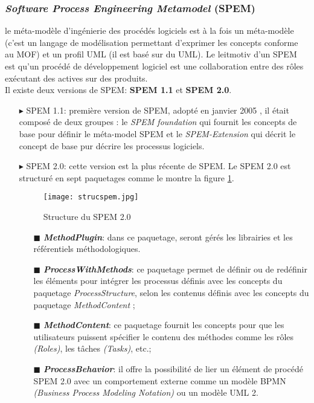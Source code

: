 \begin{itemize}
\subsubsection*{\textit{Software Process Engineering Metamodel} (SPEM)}
le méta-modèle d'ingénierie des procédés logiciels est à la fois un méta-modèle (c'est un langage de modélisation permettant d'exprimer les concepts conforme au MOF) et un profil UML (il est basé sur du UML). Le leitmotiv d'un SPEM est qu'un procédé de développement logiciel est une collaboration entre des rôles exécutant des actives sur des produits. \\
Il existe deux versions de SPEM: \textbf{SPEM 1.1} et \textbf{SPEM 2.0}.
\begin{itemize}
\item[\tiny{$\blacktriangleright$}] SPEM 1.1: première version de SPEM, adopté en janvier 2005 \cite{omg1}, il était composé de deux groupes : le \textit{SPEM foundation} qui fournit les concepts de base pour définir le méta-model SPEM et le \textit{SPEM-Extension} qui décrit le concept de base pur décrire les processus logiciels. 
\item[\tiny{$\blacktriangleright$}] SPEM 2.0: cette version est la plus récente de SPEM. Le SPEM 2.0 est structuré en sept paquetages \cite{omg2} comme le montre la figure \ref{sspem}.
\clearpage
\begin{figure}[h]
\centering
\texttt{[image: strucspem.jpg]}
\caption{\label{sspem}Structure du SPEM 2.0 \cite{omg2}}
\end{figure}
\begin{itemize}
\item[\tiny{$\blacksquare$}] \textbf{ \textit{MethodPlugin}}: dans ce paquetage, seront gérés les librairies et les référentiels méthodologiques.
\item[\tiny{$\blacksquare$}] \textbf{ \textit{ProcessWithMethods}}: ce paquetage permet de définir ou de redéfinir les éléments pour intégrer les processus définis avec les concepts du paquetage \textit{ProcessStructure}, selon les contenus définis avec les concepts du paquetage \textit{MethodContent} ;
\item[\tiny{$\blacksquare$}] \textbf{ \textit{MethodContent}}: ce paquetage fournit les concepts pour que les utilisateurs puissent spécifier le contenu des méthodes comme les rôles \textit{(Roles)}, les tâches \textit{(Tasks)}, etc.; 
\item[\tiny{$\blacksquare$}] \textbf{ \textit{ProcessBehavior}}: il offre la possibilité de lier un élément de procédé SPEM 2.0 avec un comportement externe comme un modèle BPMN \textit{(Business Process Modeling Notation)} ou un modèle UML 2.

\end{itemize}
\end{itemize}
\end{itemize}
